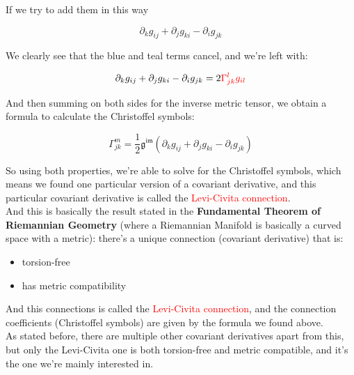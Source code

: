 If we try to add them in this way

\begin{equation}
    \partial_k g_{ij} + \partial_j g_{ki} - \partial_i g_{jk}
\end{equation}

We clearly see that the blue and teal terms cancel, and we're left with:

\begin{equation}
    \partial_k g_{ij} + \partial_j g_{ki} - \partial_i g_{jk} = 2\begingroup\color{red}\Gamma^l_{jk}\endgroup\begingroup\color{red}g_{il}\endgroup
\end{equation}

And then summing on both sides for the inverse metric tensor, we obtain a formula to calculate the Christoffel symbols:

\begin{equation}
    \Gamma^m_{jk} = \frac{1}{2}\mathfrak{g^{im}}\left(\partial_k g_{ij} + \partial_j g_{ki} - \partial_i g_{jk}\right)
\end{equation}

So using both properties, we're able to solve for the Christoffel symbols, which means we found one particular version of a covariant derivative, and this 
particular covariant derivative is called the \textcolor{red}{Levi-Civita connection}.\\

And this is basically the result stated in the \textbf{Fundamental Theorem of Riemannian Geometry} (where a Riemannian Manifold is basically a curved space with a metric):
there's a unique connection (covariant derivative) that is:
\begin{itemize}
    \item torsion-free
    \item has metric compatibility
\end{itemize}

And this connections is called the \textcolor{red}{Levi-Civita connection}, and the connection coefficients (Christoffel symbols) are given by 
the formula we found above.\\

As stated before, there are multiple other covariant derivatives apart from this, but only the Levi-Civita one is both torsion-free and metric compatible, and 
it's the one we're mainly interested in.\\


